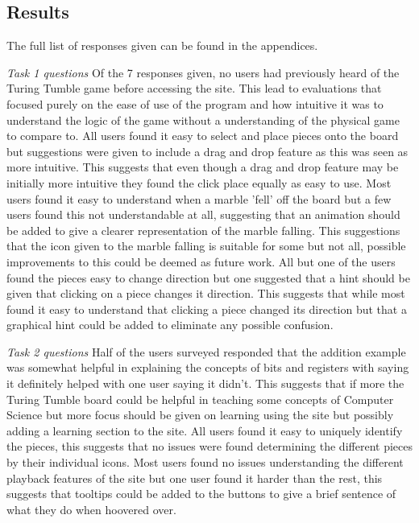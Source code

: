 \documentclass{l4proj}
\begin{document}
\subsection{Results}
The full list of responses given can be found in the appendices.

\emph{Task 1 questions}
Of the 7 responses given, no users had previously heard of the Turing Tumble game before accessing the site. This lead to evaluations that focused purely on the ease of use of the program and how intuitive it was to understand the logic of the game without a understanding of the physical game to compare to. All users found it easy to select and place pieces onto the board but suggestions were given to include a drag and drop feature as this was seen as more intuitive. This suggests that even though a drag and drop feature may be initially more intuitive they found the click place equally as easy to use. Most users found it easy to understand when a marble 'fell' off the board but a few users found this not understandable at all, suggesting that an animation should be added to give a clearer representation of the marble falling. This suggestions that the icon given to the marble falling is suitable for some but not all, possible improvements to this could be deemed as future work. All but one of the users found the pieces easy to change direction but one suggested that a hint should be given that clicking on a piece changes it direction. This suggests that while most found it easy to understand that clicking a piece changed its direction but that a graphical hint could be added to eliminate any possible confusion.

\emph{Task 2 questions}
Half of the users surveyed responded that the addition example was somewhat helpful in explaining the concepts of bits and registers with saying it definitely helped with one user saying it didn't. This suggests that if more the Turing Tumble board could be helpful in teaching some concepts of Computer Science but more focus should be given on learning using the site but possibly adding a learning section to the site. All users found it easy to uniquely identify the pieces, this suggests that no issues were found determining the different pieces by their individual icons. Most users found no issues understanding the different playback features of the site but one user found it harder than the rest, this suggests that tooltips could be added to the buttons to give a brief sentence of what they do when hoovered over.   
\end{document}
